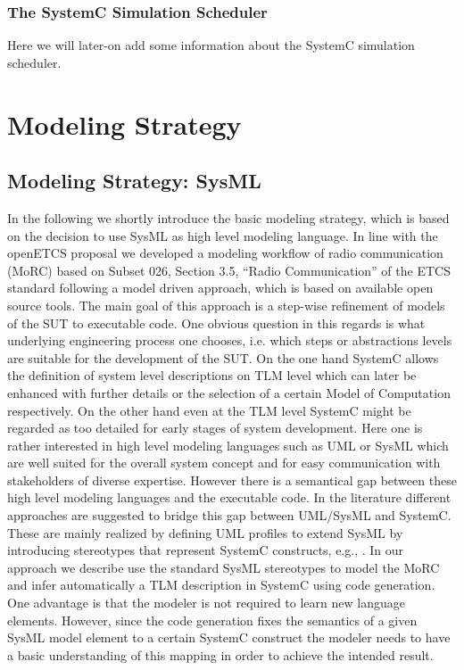 \documentclass{template/openetcs_article}
\begin{document}
\subsubsection{The SystemC Simulation Scheduler}

Here we will later-on add some information about the SystemC simulation scheduler.


\section{Modeling Strategy}
\label{sec:modeling-strategy}

\subsection{Modeling Strategy: SysML}

In the following we shortly introduce the basic modeling strategy, which is based on the decision to use SysML as high level modeling language.
In line with the openETCS proposal we developed a modeling workflow of radio communication (MoRC) based on Subset 026, Section 3.5, ``Radio Communication'' of the ETCS standard following a model driven approach, which is based on available open source tools.
The main goal of this approach is a step-wise refinement of models of the SUT to executable code.
One obvious question in this regards is what underlying engineering process one chooses, i.e. which steps or abstractions levels are suitable for the development of the SUT.
On the one hand SystemC allows the definition of system level descriptions on TLM level which can later be enhanced with further details or the selection of a certain Model of Computation respectively. 
On the other hand even at the TLM level SystemC might be regarded as too detailed for early stages of system development.
Here one is rather interested in high level modeling languages such as UML or SysML which are well suited for the overall system concept and for easy communication with stakeholders of diverse expertise.
However there is a semantical gap between these high level modeling languages and the executable code.
In the literature different approaches are suggested to bridge this gap between UML/SysML and SystemC.
These are mainly realized by defining UML profiles to extend SysML by introducing stereotypes that represent SystemC constructs, e.g., \cite{Mueller2011,Riccobene2012}.
In our approach we describe use the standard SysML stereotypes to model the MoRC and infer automatically a TLM description in SystemC using code generation.
One advantage is that the modeler is not required to learn new language elements.
However, since the code generation fixes the semantics of a given SysML model element to a certain SystemC construct the modeler needs to have a basic understanding of this mapping in order to achieve the intended result.\\
\end{document}
